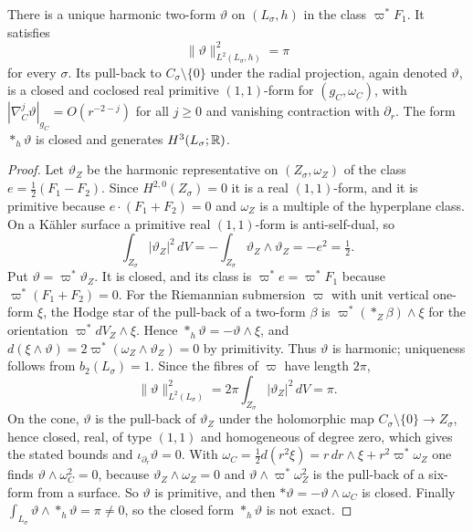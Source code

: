 \begin{lemma}\label{lem:link-form}
There is a unique harmonic two-form $\vartheta$ on $(L_\sigma,h)$ in the class $\varpi^*F_1$. It satisfies
\begin{equation}\label{eq:link-constant}
 \|\vartheta\|^2_{L^2(L_\sigma,h)}=\pi
\end{equation}
for every $\sigma$. Its pull-back to $C_\sigma\setminus\{0\}$ under the
radial projection, again denoted $\vartheta$, is a closed and coclosed
real primitive $(1,1)$-form for $(g_C,\omega_C)$, with
$|\nabla_C^j\vartheta|_{g_C}=O(r^{-2-j})$ for all $j\ge0$ and vanishing
contraction with $\partial_r$. The form $*_h\vartheta$ is closed and
generates $H^3(L_\sigma;\mathbb R)$.
\end{lemma}
\begin{proof}
Let $\vartheta_Z$ be the harmonic representative on $(Z_\sigma,\omega_Z)$
of the class $e=\tfrac12(F_1-F_2)$. Since $H^{2,0}(Z_\sigma)=0$ it is a real
$(1,1)$-form, and it is primitive because $e\cdot(F_1+F_2)=0$ and $\omega_Z$
is a multiple of the hyperplane class. On a K\"ahler surface a primitive
real $(1,1)$-form is anti-self-dual, so
\[
 \int_{Z_\sigma}|\vartheta_Z|^2\,dV=-\int_{Z_\sigma}\vartheta_Z\wedge
 \vartheta_Z=-e^2=\tfrac12 .
\]
Put $\vartheta=\varpi^*\vartheta_Z$. It is closed, and its class is
$\varpi^*e=\varpi^*F_1$ because $\varpi^*(F_1+F_2)=0$. For the Riemannian submersion $\varpi$ with
unit vertical one-form $\xi$, the Hodge star of the pull-back of a
two-form $\beta$ is $\varpi^*(*_Z\beta)\wedge\xi$ for the orientation
$\varpi^*dV_Z\wedge\xi$. Hence $*_h\vartheta=-\vartheta\wedge\xi$, and
$d(\xi\wedge\vartheta)=2\varpi^*(\omega_Z\wedge\vartheta_Z)=0$ by
primitivity. Thus $\vartheta$ is harmonic; uniqueness follows from
$b_2(L_\sigma)=1$. Since the fibres of $\varpi$ have length $2\pi$,
\[
 \|\vartheta\|^2_{L^2(L_\sigma)}=2\pi\int_{Z_\sigma}|\vartheta_Z|^2\,dV=\pi .
\]
On the cone, $\vartheta$ is the pull-back of $\vartheta_Z$ under the
holomorphic map $C_\sigma\setminus\{0\}\to Z_\sigma$, hence closed, real,
of type $(1,1)$ and homogeneous of degree zero, which gives the stated
bounds and $\iota_{\partial_r}\vartheta=0$. With
$\omega_C=\tfrac12d(r^2\xi)=r\,dr\wedge\xi+r^2\varpi^*\omega_Z$ one finds
$\vartheta\wedge\omega_C^2=0$, because
$\vartheta_Z\wedge\omega_Z=0$ and $\vartheta\wedge \varpi^*\omega_Z^2$ is the
pull-back of a six-form from a surface. So $\vartheta$ is primitive, and
then $*\vartheta=-\vartheta\wedge\omega_C$ is closed. Finally
$\int_{L_\sigma}\vartheta\wedge*_h\vartheta=\pi\ne0$, so the closed form
$*_h\vartheta$ is not exact.
\end{proof}

